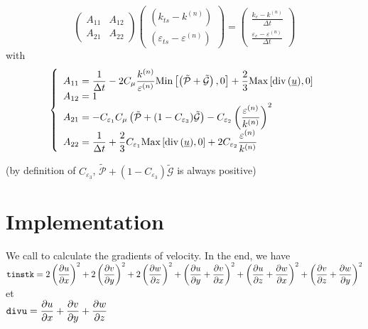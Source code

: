\begin{equation}
\left(\begin{array}{cc}
A_{11}&A_{12}\\
A_{21}&A_{22}
\end{array}\right)
\left(\begin{array}{c}
(k_{ts}-k^{(n)})\\(\varepsilon_{ts}-\varepsilon^{(n)})
\end{array}\right)
=\left(\begin{array}{c}
\displaystyle\frac{k_e-k^{(n)}}{\Delta t}\\
\displaystyle\frac{\varepsilon_e-\varepsilon^{(n)}}{\Delta t}
\end{array}\right)
\end{equation}
with
\begin{equation}
\left\{\begin{array}{l}
\displaystyle A_{11}=\frac{1}{\Delta t}
-2 C_\mu\frac{k^{(n)}}{\varepsilon^{(n)}}
\text{Min}\left[\left(\tilde{\mathcal{P}}+\tilde{\mathcal{G}}\right),0\right]
+\frac{2}{3}\text{Max}\left[\text{div}\,(\underline{u}),0\right]\\
\displaystyle A_{12}= 1\\
\displaystyle A_{21}=
- C_{\varepsilon_1} C_\mu \left(\tilde{\mathcal{P}}
+(1-C_{\varepsilon_3})\tilde{\mathcal{G}}\right)
- C_{\varepsilon_2}\left(\frac{\varepsilon^{(n)}}{k^{(n)}}\right)^2\\
\displaystyle A_{22}=\frac{1}{\Delta t}
+\frac{2}{3}C_{\varepsilon_1}\text{Max}\left[\text{div}\,(\underline{u}),0\right]
+2 C_{\varepsilon_2}\frac{\varepsilon^{(n)}}{k^{(n)}}
\end{array}\right.
\end{equation}

(by definition of $C_{\varepsilon_3}$,
$\tilde{\mathcal{P}}+(1-C_{\varepsilon_3})\tilde{\mathcal{G}}$
is always positive)

\section*{Implementation}

We call  to calculate the gradients of velocity.
In the end, we have \\
$\displaystyle \text{\texttt{tinstk}}=
2\left(\frac{\partial u}{\partial x}\right)^2+
2\left(\frac{\partial v}{\partial y}\right)^2+
2\left(\frac{\partial w}{\partial z}\right)^2+
\left(\frac{\partial u}{\partial y}+\frac{\partial v}{\partial x}\right)^2+
\left(\frac{\partial u}{\partial z}+\frac{\partial w}{\partial x}\right)^2+
\left(\frac{\partial v}{\partial z}+\frac{\partial w}{\partial y}\right)^2$\\
et\\
$\displaystyle \text{\texttt{divu}}=
\frac{\partial u}{\partial x}+\frac{\partial v}{\partial y}
+\frac{\partial w}{\partial z}$

